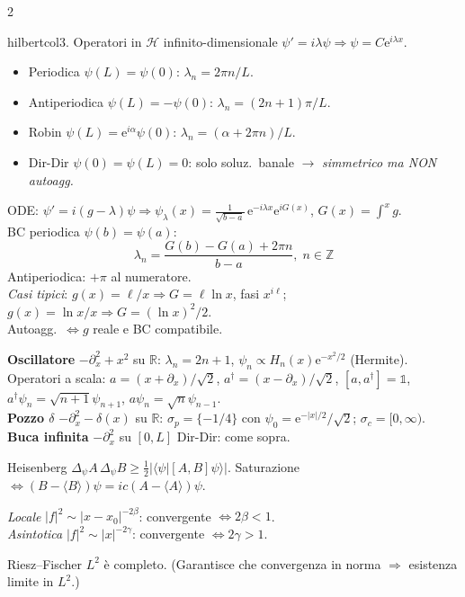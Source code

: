 \documentclass[10pt,a4paper]{article}
\newcommand{\R}{\mathbb{R}}
\newcommand{\Z}{\mathbb{Z}}
\newcommand{\eu}{\mathrm{e}}
\newcommand{\braket}[2]{\langle#1|#2\rangle}
\begin{document}
\begin{multicols}{2}
\begin{secbox}{hilbertcol}{3. Operatori in $\mathcal H$ infinito-dimensionale}
$\psi'=i\lambda\psi\Rightarrow\psi=C\eu^{i\lambda x}$.
\begin{itemize}
\item Periodica $\psi(L)=\psi(0)$: $\lambda_n=2\pi n/L$.
\item Antiperiodica $\psi(L)=-\psi(0)$: $\lambda_n=(2n+1)\pi/L$.
\item Robin $\psi(L)=\eu^{i\alpha}\psi(0)$: $\lambda_n=(\alpha+2\pi n)/L$.
\item Dir-Dir $\psi(0)=\psi(L)=0$: solo soluz.\ banale $\to$ \emph{simmetrico ma NON autoagg.}
\end{itemize}

ODE: $\psi'=i(g-\lambda)\psi\Rightarrow\psi_\lambda(x)=\frac{1}{\sqrt{b-a}}\,\eu^{-i\lambda x}\eu^{iG(x)}$, $G(x)=\int^x g$.\\
BC periodica $\psi(b)=\psi(a)$:
$$\lambda_n=\frac{G(b)-G(a)+2\pi n}{b-a},\;n\in\Z$$
Antiperiodica: $+\pi$ al numeratore.\\
\emph{Casi tipici}: $g(x)=\ell/x\Rightarrow G=\ell\ln x$, fasi $x^{i\ell}$; $g(x)=\ln x/x\Rightarrow G=(\ln x)^2/2$.\\
Autoagg.\ $\iff g$ reale e BC compatibile.

\textbf{Oscillatore} $-\partial_x^2+x^2$ su $\R$: $\lambda_n=2n+1$, $\psi_n\propto H_n(x)\eu^{-x^2/2}$ (Hermite). Operatori a scala: $a=(x+\partial_x)/\sqrt 2$, $a^\dagger=(x-\partial_x)/\sqrt 2$, $[a,a^\dagger]=\mathbb 1$, $a^\dagger\psi_n=\sqrt{n+1}\psi_{n+1}$, $a\psi_n=\sqrt n\psi_{n-1}$.\\
\textbf{Pozzo $\delta$} $-\partial_x^2-\delta(x)$ su $\R$: $\sigma_p=\{-1/4\}$ con $\psi_0=\eu^{-|x|/2}/\sqrt 2$; $\sigma_c=[0,\infty)$.\\
\textbf{Buca infinita} $-\partial_x^2$ su $[0,L]$ Dir-Dir: come sopra.

\begin{teobox}{Heisenberg}
$\Delta_\psi A\,\Delta_\psi B\ge\tfrac12|\braket{\psi}{[A,B]\psi}|$. Saturazione $\iff(B-\langle B\rangle)\psi=ic(A-\langle A\rangle)\psi$.
\end{teobox}

\emph{Locale} $|f|^2\sim|x-x_0|^{-2\beta}$: convergente $\iff 2\beta<1$.\\
\emph{Asintotica} $|f|^2\sim|x|^{-2\gamma}$: convergente $\iff 2\gamma>1$.

\begin{teobox}{Riesz--Fischer}
$L^2$ è completo. (Garantisce che convergenza in norma $\Rightarrow$ esistenza limite in $L^2$.)
\end{teobox}


\end{secbox}
\end{multicols}
\end{document}
